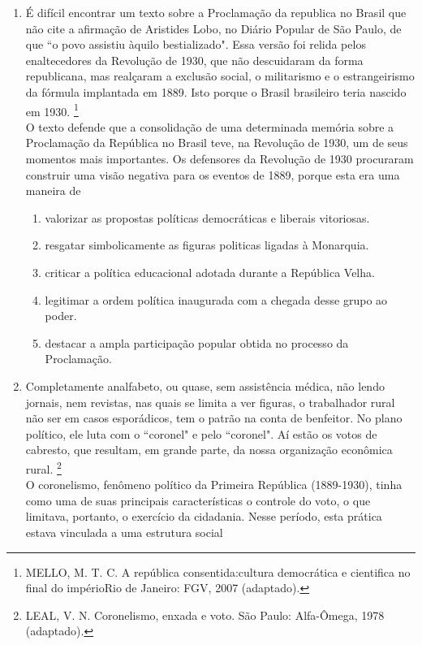 \documentclass[10pt,a4paper]{article}
\begin{document}
\begin{multicols}{2}
\begin{enumerate}
	\item É difícil encontrar um texto sobre a Proclamação  da republica no Brasil que não cite a afirmação de Aristides Lobo, no Diário Popular de São Paulo, de que ``o povo assistiu àquilo bestializado". Essa versão foi relida pelos enaltecedores da Revolução de 1930, que não descuidaram da forma republicana, mas realçaram a exclusão social, o militarismo e o estrangeirismo da fórmula implantada em 1889. Isto porque o Brasil brasileiro teria nascido em 1930. \footnote{MELLO, M. T. C. A república consentida:cultura democrática e cientifica no final do impérioRio de Janeiro: FGV, 2007 (adaptado).} \\
	O texto defende que a consolidação de uma determinada memória sobre a Proclamação da República no Brasil teve, na Revolução de 1930, um de seus momentos mais importantes. Os defensores da Revolução de 1930 procuraram construir uma visão negativa para os eventos de 1889, porque esta era uma maneira de
		\begin{enumerate}
		\item valorizar as propostas políticas democráticas e liberais vitoriosas.
		\item resgatar simbolicamente as figuras politicas ligadas à Monarquia.
		\item criticar a política educacional adotada durante a República Velha.
		\item legitimar a ordem política inaugurada com a chegada desse grupo ao poder.
		\item destacar a ampla participação popular obtida no processo da Proclamação.
		\end{enumerate}


	\item Completamente analfabeto, ou quase, sem assistência médica, não lendo jornais, nem revistas,
 nas quais se limita a ver figuras, o trabalhador rural não ser em casos esporádicos, tem o patrão na conta 
de benfeitor. No plano político, ele luta com o ``coronel" e pelo ``coronel". Aí estão os votos de cabresto, que resultam, em grande parte, da nossa organização econômica rural. \footnote{LEAL, V. N. Coronelismo, enxada e voto. São Paulo: Alfa-Ômega, 1978 (adaptado).} \\
	O coronelismo, fenômeno político da Primeira República (1889-1930), tinha como uma de suas principais características o controle do voto, o que limitava, portanto, o exercício da cidadania. Nesse período, esta prática estava vinculada a uma estrutura social


\end{enumerate}
\end{multicols}
\end{document}
